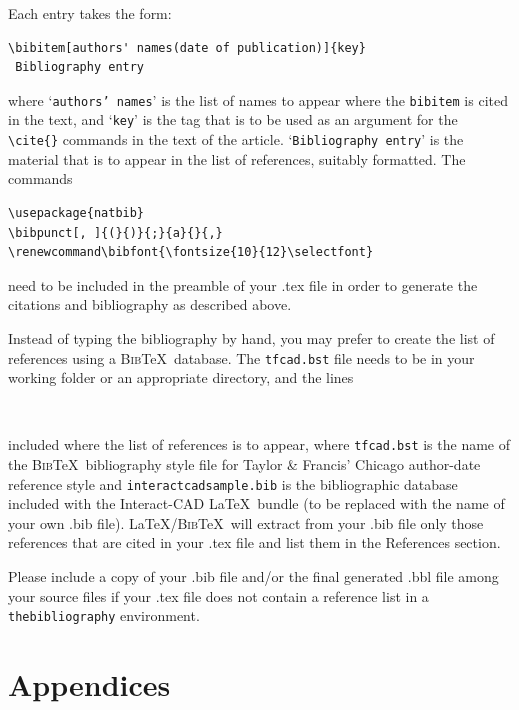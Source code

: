 \documentclass[]{interact}
\renewcommand\bibfont{\fontsize{10}{12}\selectfont}%
\theoremstyle{plain}%
\theoremstyle{definition}
\theoremstyle{remark}
\begin{document}
\bigskip
\noindent Each entry takes the form:
\begin{verbatim}
\bibitem[authors' names(date of publication)]{key}
 Bibliography entry
\end{verbatim}
where `\texttt{authors' names}' is the list of names to appear where the \verb"bibitem" is cited in the text, and `\texttt{key}' is the tag that is to be used as an argument for the \verb"\cite{}" commands in the text of the article. `\texttt{Bibliography entry}' is the material that is to appear in the list of references, suitably formatted. The commands
\begin{verbatim}
\usepackage{natbib}
\bibpunct[, ]{(}{)}{;}{a}{}{,}
\renewcommand\bibfont{\fontsize{10}{12}\selectfont}
\end{verbatim}
need to be included in the preamble of your .tex file in order to generate the citations and bibliography as described above.

Instead of typing the bibliography by hand, you may prefer to create the list of references using a \textsc{Bib}\TeX\ database. The \texttt{tfcad.bst} file needs to be in your working folder or an appropriate directory, and the lines
\begin{verbatim}


\end{verbatim}
included where the list of references is to appear, where \texttt{tfcad.bst} is the name of the \textsc{Bib}\TeX\ bibliography style file for Taylor \& Francis' Chicago author-date reference style and \texttt{interactcadsample.bib} is the bibliographic database included with the \textsf{Interact}-CAD \LaTeX\ bundle (to be replaced with the name of your own .bib file). \LaTeX/\textsc{Bib}\TeX\ will extract from your .bib file only those references that are cited in your .tex file and list them in the References section.

Please include a copy of your .bib file and/or the final generated .bbl file among your source files if your .tex file does not contain a reference list in a \texttt{thebibliography} environment.




\section{Appendices}
\end{document}
